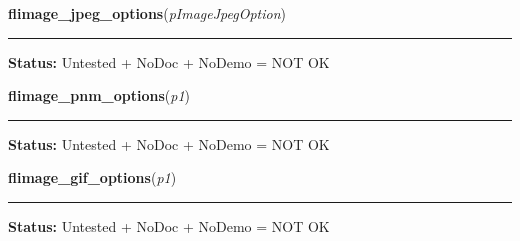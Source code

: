     \vspace{0.5ex}

\hspace{.8\funcindent}\begin{boxedminipage}{\funcwidth}

    \raggedright \textbf{flimage\_jpeg\_options}(\textit{pImageJpegOption})

    \vspace{-1.5ex}

    \rule{\textwidth}{0.5\fboxrule}
\setlength{\parskip}{2ex}
\setlength{\parskip}{1ex}
\textbf{Status:} Untested + NoDoc + NoDemo = NOT OK



    \end{boxedminipage}

    \label{xformslib:library:flimage_pnm_output_options}

    \vspace{0.5ex}

\hspace{.8\funcindent}\begin{boxedminipage}{\funcwidth}

    \raggedright \textbf{flimage\_pnm\_options}(\textit{p1})

    \vspace{-1.5ex}

    \rule{\textwidth}{0.5\fboxrule}
\setlength{\parskip}{2ex}
\setlength{\parskip}{1ex}
\textbf{Status:} Untested + NoDoc + NoDemo = NOT OK



    \end{boxedminipage}

    \label{xformslib:library:flimage_gif_output_options}

    \vspace{0.5ex}

\hspace{.8\funcindent}\begin{boxedminipage}{\funcwidth}

    \raggedright \textbf{flimage\_gif\_options}(\textit{p1})

    \vspace{-1.5ex}

    \rule{\textwidth}{0.5\fboxrule}
\setlength{\parskip}{2ex}
\setlength{\parskip}{1ex}
\textbf{Status:} Untested + NoDoc + NoDemo = NOT OK



    \end{boxedminipage}

